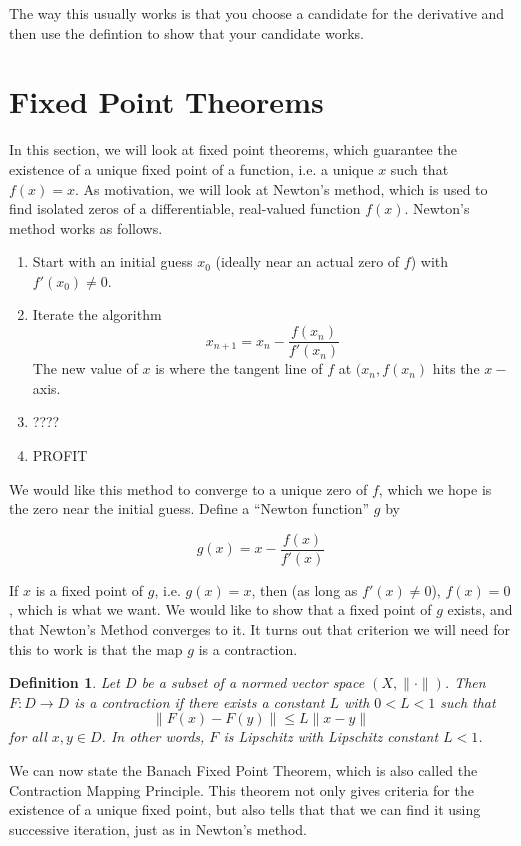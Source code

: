 \documentclass[12pt]{amsart}         %
\newtheorem{definition}{Definition}[section]
\theoremstyle{remark}
\begin{document}
The way this usually works is that you choose a candidate for the derivative and then use the defintion to show that your candidate works.

\section{Fixed Point Theorems}

In this section, we will look at fixed point theorems, which guarantee the existence of a unique fixed point of a function, i.e. a unique $x$ such that $f(x) = x$. As motivation, we will look at Newton's method, which is used to find isolated zeros of a differentiable, real-valued function $f(x)$. Newton's method works as follows.

\begin{enumerate}
\item Start with an initial guess $x_0$ (ideally near an actual zero of $f$) with $f'(x_0) \neq 0$.
\item Iterate the algorithm 
\[
x_{n+1} = x_n - \frac{f(x_n)}{f'(x_n)}
\]
The new value of $x$ is where the tangent line of $f$ at $(x_n, f(x_n)$ hits the $x-$axis.
\item ????
\item PROFIT
\end{enumerate}

We would like this method to converge to a unique zero of $f$, which we hope is the zero near the initial guess. Define a ``Newton function'' $g$ by

\[
g(x) = x - \frac{f(x)}{f'(x)}
\]

If $x$ is a fixed point of $g$, i.e. $g(x) = x$, then (as long as $f'(x) \neq 0$), $f(x) = 0$, which is what we want. We would like to show that a fixed point of $g$ exists, and that Newton's Method converges to it. It turns out that criterion we will need for this to work is that the map $g$ is a contraction.

\begin{definition}Let $D$ be a subset of a normed vector space $(X, \|\cdot\|)$. Then $F: D \rightarrow D$ is a \emph{contraction} if there exists a constant $L$ with $0 < L < 1$ such that 
\[
\|F(x) - F(y)\| \leq L \|x - y\|
\]
for all $x, y \in D$. In other words, $F$ is Lipschitz with Lipschitz constant $L < 1$.
\end{definition}

We can now state the Banach Fixed Point Theorem, which is also called the Contraction Mapping Principle. This theorem not only gives criteria for the existence of a unique fixed point, but also tells that that we can find it using successive iteration, just as in Newton's method. 
\end{document}
